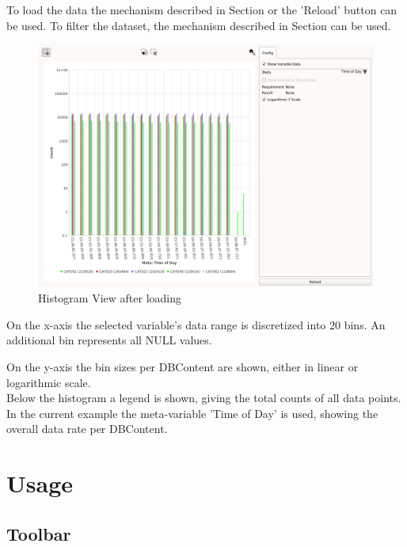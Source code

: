 To load the data the mechanism described in Section  or the 'Reload' button can be used. To filter the dataset, the mechanism described in Section  can be used. \\

\begin{figure}[H]
    \hspace*{-2cm}
    \includegraphics[width=18cm,frame]{figures/histogram_loaded.png}
  \caption{Histogram View after loading}
\end{figure}

On the x-axis the selected variable's data range is discretized into 20 bins. An additional bin represents all NULL values.

On the y-axis the bin sizes per DBContent are shown, either in linear or logarithmic scale. \\

Below the histogram a legend is shown, giving the total counts of all data points. \\

In the current example the meta-variable 'Time of Day' is used, showing the overall data rate per DBContent.

\section{Usage}

\subsection{Toolbar}

